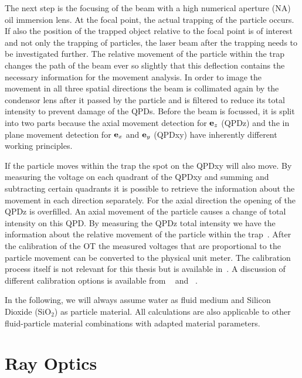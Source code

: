 The next step is the focusing of the beam with a high numerical aperture (NA) 
oil immersion lens. At the focal point, the actual trapping of the particle 
occurs. If also the position of the trapped object relative to the focal point 
is of interest and not only the trapping of particles, the laser beam after the 
trapping needs to be investigated further. The relative movement of the 
particle within the trap changes the path of the beam ever so slightly that 
this deflection contains the necessary information for the movement analysis. 
In order to image the movement in all three spatial directions the beam is 
collimated again by the condensor lens after it passed by the particle and is 
filtered to reduce its total intensity to prevent damage of the QPDs. Before 
the beam is focussed, it is split into two parts because the axial movement 
detection for $\vb{e}_{z}$ (QPDz) and the in plane movement detection for $\vb{e}_{x}$ and 
$\vb{e}_{y}$ (QPDxy) have inherently different working principles.

If the particle moves within the trap the spot on the QPDxy will also move. By 
measuring the voltage on each quadrant of the QPDxy and summing and subtracting 
certain quadrants it is possible to retrieve the information about the movement 
in each direction separately. For the axial direction the opening of the QPDz 
is overfilled. An axial movement of the particle causes a change of total 
intensity on this QPD. By measuring the QPDz total intensity we have the 
information about the relative movement of the particle within the 
trap~\cite{Felgner1995a}. After the calibration of the OT the measured 
voltages that are proportional to the particle movement can be converted to the 
physical unit meter. The calibration process itself is not relevant for this 
thesis but is available in~\cite{Lamprecht2017}. A discussion of different 
calibration options is available from 
\citeauthor{Svoboda1994}~\cite{Svoboda1994} and 
\citeauthor{Jun2004}~\cite{Jun2004}.

In the following, we will always assume water as fluid medium and Silicon 
Dioxide (SiO$_{2}$) as particle material. All calculations are also applicable 
to other fluid-particle material combinations with adapted material parameters.

\section{Ray Optics\label{sec:TO-rayoptics}}


